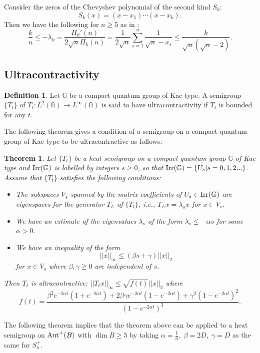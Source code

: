 \documentclass[12pt]{amsart}
\theoremstyle{plain} %
\newtheorem{theorem}[equation]{Theorem}
\theoremstyle{definition}
\newtheorem{definition}[equation]{Definition}
\theoremstyle{remark}
\begin{document}
Consider the zeros of the Chevyshev polynomial of the second kind $S_k$:
\[S_k(x)=(x-x_1)\cdots(x-x_k).\]
Then we have the following for $n \geq 5$ as in \cite[Lemma 1.8]{FHLUZ}:
\[\frac{k}{n}\leq -\lambda_k=\frac{\Pi_k'(n)}{2\sqrt{n}\Pi_k(n)}=\frac{1}{2\sqrt{n}}\sum_{s=1}^n\frac{1}{\sqrt{n}-x_s}\leq \frac{k}{\sqrt{n}(\sqrt{n}-2)}.\]

\subsection{Ultracontractivity}

 \begin{definition}
 Let $\mathbb{G}$ be a compact quantum group of Kac type.
 A semigroup $\{T_t\}$ of $T_t:L^2(\mathbb{G})\to L^\infty(\mathbb{G})$ is said to have ultracontractivity if $T_t$ is bounded for any $t$.
 \end{definition}

The following theorem \cite[Theorem 2.1]{FHLUZ} gives a condition of a semigroup on a compact quantum group of Kac type to be ultracontractive as follows:

\begin{theorem}
Let $\{T_t\}$ be a heat semigroup on a compact quantum group $\mathbb{G}$ of Kac type and ${\rm Irr}(\mathbb{G})$ is labelled by integers $s\geq 0$, so that ${\rm Irr}(\mathbb{G})=\{U_s|s=0, 1, 2...\}$. Assume that $\{T_t\}$ satisfies the following conditions:
\begin{itemize}
\item The subspaces $V_s$ spanned by the matrix coefficients of $U_s\in{\rm Irr}(\mathbb{G})$ are eigenspaces for the generator $T_L$ of $\{T_t\}$, i.e., $T_L x=\lambda_s x$ for $x\in V_s$.
\item We have an estimate of the eigenvalues $\lambda_s$ of the form $\lambda_s\leq-\alpha s$ for some $\alpha>0$. 
\item We have an inequality of the form 
\[||x||_\infty\leq(\beta s+\gamma)||x||_2\]
for $x\in V_s$ where $\beta, \gamma\geq 0$ are independent of $s$.
\end{itemize}
Then $T_t$ is ultracontractive: $||T_tx||_\infty\leq\sqrt{f(t)}||x||_2$ where
\[f(t)=\frac{\beta^2e^{-2\alpha t}(1+e^{-2\alpha t})+2\beta\gamma e^{-2\alpha t}(1-e^{-2\alpha t})+\gamma^2(1-e^{-2\alpha t})^2}{(1-e^{-2\alpha t})^3}.\]

\end{theorem}

The following theorem \cite[Theorem 4.10]{Bra13} implies that the theorem above can be applied to a heat semigroup on ${\rm Aut}^+(B)$ with $\dim B\geq5$ by taking $\alpha=\frac{1}{n},\;\beta=2D,\;\gamma=D$ as the same for $S_n^+$.
\end{document}
